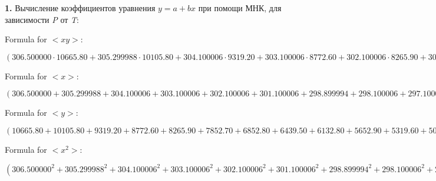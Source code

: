 \documentclass[12pt,a4paper]{article}
\begin{document}
\textbf{1.} Вычисление коэффициентов уравнения $y = a + bx$ при помощи МНК, для зависимости \textit{P} от \textit{T}:

\vspace{0,5cm}

Formula for $<xy>:$

$(306.500000 \cdot 10665.80 + 305.299988 \cdot 10105.80 + 304.100006 \cdot 9319.20 + 303.100006 \cdot 8772.60 + 302.100006 \cdot 8265.90 + 301.100006 \cdot 7852.70 + 298.899994 \cdot 6852.80 + 298.100006 \cdot 6439.50 + 297.100006 \cdot 6132.80 + 296.100006 \cdot 5652.90 + 295.100006 \cdot 5319.60 + 294.100006 \cdot 5020.00 + 293.100006 \cdot 4679.60 + 292.100006 \cdot 4259.60 + 293.500000 \cdot 4772.90 + 294.700012 \cdot 5039.60 + 295.700012 \cdot 5546.20 + 296.500000 \cdot 5799.50 + 297.500000 \cdot 6132.80 + 298.899994 \cdot 6612.80 + 299.500000 \cdot 7039.40 + 300.500000 \cdot 7532.70 + 301.500000 \cdot 7986.00 + 302.500000 \cdot 8479.30 + 303.500000 \cdot 9052.60 + 304.500000 \cdot 9465.90 + 305.500000 \cdot 10132.50 + 306.700012 \cdot 10812.50) / 28$
\vspace{0,5cm}

Formula for $<x>:$

$(306.500000 + 305.299988 + 304.100006 + 303.100006 + 302.100006 + 301.100006 + 298.899994 + 298.100006 + 297.100006 + 296.100006 + 295.100006 + 294.100006 + 293.100006 + 292.100006 + 293.500000 + 294.700012 + 295.700012 + 296.500000 + 297.500000 + 298.899994 + 299.500000 + 300.500000 + 301.500000 + 302.500000 + 303.500000 + 304.500000 + 305.500000 + 306.700012) / 28$
\vspace{0,5cm}

Formula for $<y>:$

$(10665.80 + 10105.80 + 9319.20 + 8772.60 + 8265.90 + 7852.70 + 6852.80 + 6439.50 + 6132.80 + 5652.90 + 5319.60 + 5020.00 + 4679.60 + 4259.60 + 4772.90 + 5039.60 + 5546.20 + 5799.50 + 6132.80 + 6612.80 + 7039.40 + 7532.70 + 7986.00 + 8479.30 + 9052.60 + 9465.90 + 10132.50 + 10812.50) / 28$
\vspace{0,5cm}

Formula for $<x^2>:$

$(306.500000^2 + 305.299988^2 + 304.100006^2 + 303.100006^2 + 302.100006^2 + 301.100006^2 + 298.899994^2 + 298.100006^2 + 297.100006^2 + 296.100006^2 + 295.100006^2 + 294.100006^2 + 293.100006^2 + 292.100006^2 + 293.500000^2 + 294.700012^2 + 295.700012^2 + 296.500000^2 + 297.500000^2 + 298.899994^2 + 299.500000^2 + 300.500000^2 + 301.500000^2 + 302.500000^2 + 303.500000^2 + 304.500000^2 + 305.500000^2 + 306.700012^2) / 28$
\vspace{0,5cm}
\end{document}
